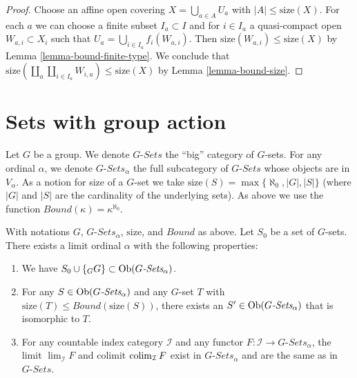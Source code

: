 \begin{proof}
Choose an affine open covering $X = \bigcup_{a \in A} U_a$ with
$|A| \leq \text{size}(X)$. For each $a$ we can choose
a finite subset $I_a \subset I$ and for $i \in I_a$ a quasi-compact open
$W_{a, i} \subset X_i$ such that $U_a = \bigcup_{i \in I_a} f_i(W_{a, i})$.
Then $\text{size}(W_{a, i}) \leq \text{size}(X)$ by
Lemma \ref{lemma-bound-finite-type}.
We conclude that
$\text{size}(\coprod_a \coprod_{i \in I_a} W_{i, a}) \leq \text{size}(X)$
by Lemma \ref{lemma-bound-size}.
\end{proof}





\section{Sets with group action}
\label{section-sets-with-group-action}

\noindent
Let $G$ be a group. We denote $G\textit{-Sets}$ the ``big'' category
of $G$-sets. For any ordinal $\alpha$, we denote
$G\textit{-Sets}_\alpha$ the full subcategory of $G\textit{-Sets}$
whose objects are in $V_\alpha$. As a notion for size of a $G$-set
we take $\text{size}(S) = \max\{\aleph_0, |G|, |S|\}$ (where $|G|$ and
$|S|$ are the cardinality of the underlying sets). As above we use the function
$Bound(\kappa) = \kappa^{\aleph_0}$.

\begin{lemma}
\label{lemma-sets-with-group-action}
With notations $G$, $G\textit{-Sets}_\alpha$, $\text{size}$,
and $Bound$ as above. Let $S_0$ be a set of $G$-sets.
There exists a limit ordinal $\alpha$ with the following properties:
\begin{enumerate}
\item We have $S_0 \cup \{{}_GG\} \subset \mathop{\mathrm{Ob}}\nolimits(G\textit{-Sets}_\alpha)$.
\item For any $S \in \mathop{\mathrm{Ob}}\nolimits(G\textit{-Sets}_\alpha)$ and any
$G$-set $T$ with $\text{size}(T) \leq Bound(\text{size}(S))$,
there exists an $S' \in \mathop{\mathrm{Ob}}\nolimits(G\textit{-Sets}_\alpha)$
that is isomorphic to $T$.
\item For any countable index category $\mathcal{I}$ and
any functor $F : \mathcal{I} \to G\textit{-Sets}_\alpha$, the
limit $\lim_\mathcal{I} F$ and colimit
$\mathop{\mathrm{colim}}\nolimits_\mathcal{I} F$ exist in $G\textit{-Sets}_\alpha$
and are the same as in $G\textit{-Sets}$.
\end{enumerate}
\end{lemma}

